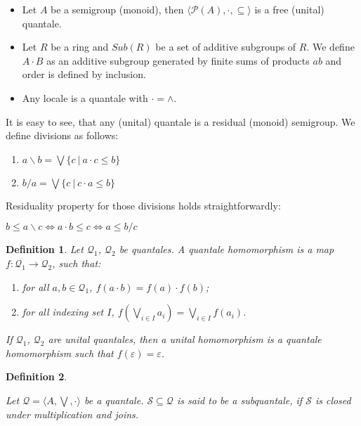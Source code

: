 \documentclass[a4paper]{article}
\theoremstyle{defin}
\newtheorem{defin}{Definition}
\theoremstyle{theorem}
\theoremstyle{prop}
\theoremstyle{lemma}
\theoremstyle{ex}
\theoremstyle{col}
\begin{document}
\begin{itemize}
\item Let $A$ be a semigroup (monoid), then $\langle \mathcal{P}(A), \cdot, \subseteq \rangle$
is a free (unital) quantale.
\item Let $R$ be a ring and $Sub(R)$ be a set of additive subgroups of $R$.
We define $A \cdot B$ as an additive subgroup generated by finite sums of products $ab$ and order is defined by inclusion.
\item Any locale is a quantale with $\cdot = \wedge$.
\end{itemize}

It is easy to see, that any (unital) quantale is a residual (monoid) semigroup. We define divisions as follows:

\begin{enumerate}
\item $a \backslash b = \bigvee \{ c \: | \: a \cdot c \leq b \}$
\item $b / a = \bigvee \{ c \: | \: c \cdot a \leq b \}$
\end{enumerate}

Residuality property for those divisions holds straightforwardly:

\begin{center}
  $b \leq a \backslash c \Leftrightarrow a \cdot b \leq c \Leftrightarrow a \leq b / c$
\end{center}

\begin{defin}

  Let $\mathcal{Q}_1$, $\mathcal{Q}_2$ be quantales. A quantale homomorphism is a map $f : \mathcal{Q}_1 \to \mathcal{Q}_2$, such that:

  \begin{enumerate}
    \item for all $a,b \in \mathcal{Q}_1$, $f(a \cdot b) = f(a) \cdot f(b)$;
    \item for all indexing set $I$, $f(\bigvee \limits_{i \in I} a_i) = \bigvee \limits_{i \in I} f(a_i)$.
  \end{enumerate}

  If $\mathcal{Q}_1$, $\mathcal{Q}_2$ are unital quantales, then a unital homomorphism is a quantale homomorphism such that $f(\varepsilon) = \varepsilon$.
\end{defin}

\begin{defin}
$ $

  Let $\mathcal{Q} = \langle A, \bigvee, \cdot \rangle$ be a quantale. $\mathcal{S} \subseteq \mathcal{Q}$ is said to be a subquantale, if $\mathcal{S}$ is closed under multiplication and joins.
\end{defin}
\end{document}
